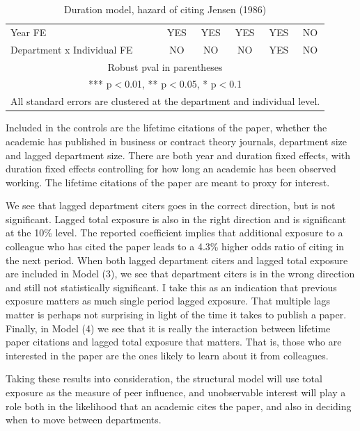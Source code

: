 \documentclass[]{article}
\begin{document}
\begin{table}
\begin{tabular}{lccccc}
    Year FE                                 & YES        & YES        & YES         & YES       & NO         \\
     Department x Individual FE             & NO         & NO         & NO          & YES       & NO         \\ \hline
    \multicolumn{6}{c}{ Robust pval in parentheses}                                                          \\
    \multicolumn{6}{c}{ *** p$<$0.01, ** p$<$0.05, * p$<$0.1}                                                \\
    \multicolumn{6}{c}{ All standard errors are clustered at the department and individual level.}           \\
    \end{tabular}
    \caption{Duration model, hazard of citing Jensen (1986)}
    \label{tab:red_form}
\end{table}
Included in the controls are the lifetime citations of the paper, whether the academic has published in business or contract theory journals, department size and lagged department size.  There are both year and duration fixed effects, with duration fixed effects controlling for how long an academic has been observed working.  The lifetime citations of the paper are meant to proxy for interest.

We see that lagged department citers goes in the correct direction, but is not significant.  Lagged total exposure is also in the right direction and is significant at the 10\% level.  The reported coefficient implies that additional exposure to a colleague who has cited the paper leads to a 4.3\% higher odds ratio of citing in the next period.  When both lagged department citers and lagged total exposure are included in Model (3), we see that department citers is in the wrong direction and still not statistically significant.  I take this as an indication that previous exposure matters as much single period lagged exposure.  That multiple lags matter is perhaps not surprising in light of the time it takes to publish a paper.  Finally, in Model (4) we see that it is really the interaction between lifetime paper citations and lagged total exposure that matters.  That is, those who are interested in the paper are the ones likely to learn about it from colleagues.

Taking these results into consideration, the structural model will use total exposure as the measure of peer influence, and unobservable interest will play a role both in the likelihood that an academic cites the paper, and also in deciding when to move between departments.
\end{document}

